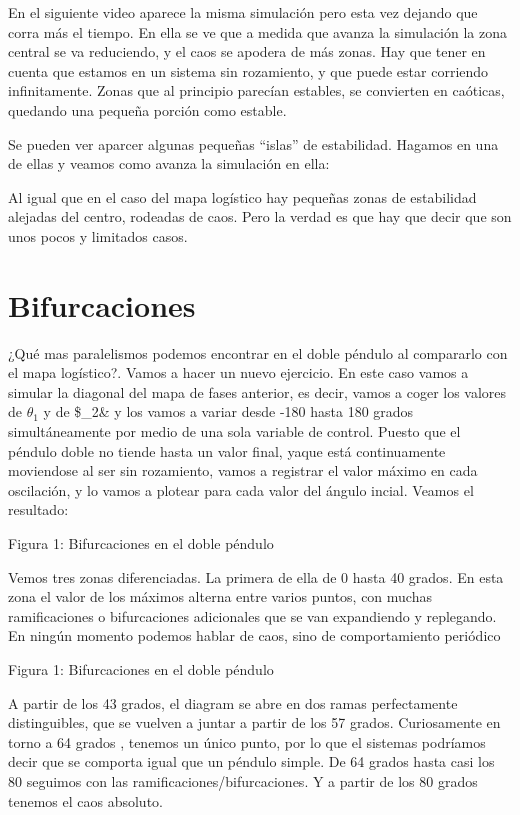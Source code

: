 \documentclass[
  11pt,
  a4paper,
  DIV=11,
  numbers=noendperiod]{scrreprt}
\begin{document}
En el siguiente video aparece la misma simulación pero esta vez dejando
que corra más el tiempo. En ella se ve que a medida que avanza la
simulación la zona central se va reduciendo, y el caos se apodera de más
zonas. Hay que tener en cuenta que estamos en un sistema sin rozamiento,
y que puede estar corriendo infinitamente. Zonas que al principio
parecían estables, se convierten en caóticas, quedando una pequeña
porción como estable.

Se pueden ver aparcer algunas pequeñas ``islas'' de estabilidad. Hagamos
en una de ellas y veamos como avanza la simulación en ella:

Al igual que en el caso del mapa logístico hay pequeñas zonas de
estabilidad alejadas del centro, rodeadas de caos. Pero la verdad es que
hay que decir que son unos pocos y limitados casos.

\chapter{Bifurcaciones}\label{bifurcaciones}

¿Qué mas paralelismos podemos encontrar en el doble péndulo al
compararlo con el mapa logístico?. Vamos a hacer un nuevo ejercicio. En
este caso vamos a simular la diagonal del mapa de fases anterior, es
decir, vamos a coger los valores de \(\theta_1\) y de \$\theta\_2\& y
los vamos a variar desde -180 hasta 180 grados simultáneamente por medio
de una sola variable de control. Puesto que el péndulo doble no tiende
hasta un valor final, yaque está continuamente moviendose al ser sin
rozamiento, vamos a registrar el valor máximo en cada oscilación, y lo
vamos a plotear para cada valor del ángulo incial. Veamos el resultado:

Figura 1: Bifurcaciones en el doble péndulo

Vemos tres zonas diferenciadas. La primera de ella de 0 hasta 40 grados.
En esta zona el valor de los máximos alterna entre varios puntos, con
muchas ramificaciones o bifurcaciones adicionales que se van expandiendo
y replegando. En ningún momento podemos hablar de caos, sino de
comportamiento periódico

Figura 1: Bifurcaciones en el doble péndulo

A partir de los 43 grados, el diagram se abre en dos ramas perfectamente
distinguibles, que se vuelven a juntar a partir de los 57 grados.
Curiosamente en torno a 64 grados , tenemos un único punto, por lo que
el sistemas podríamos decir que se comporta igual que un péndulo simple.
De 64 grados hasta casi los 80 seguimos con las
ramificaciones/bifurcaciones. Y a partir de los 80 grados tenemos el
caos absoluto.
\end{document}
